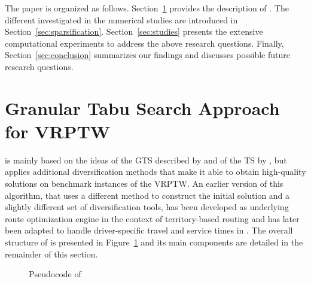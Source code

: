 \documentclass[11pt,a4paper,fleqn]{article}
\begin{document}
The paper is organized as follows.  Section~\ref{sec:GranularTS} provides the description of \tsnew. The different \sms investigated in the numerical studies are introduced in Section~\ref{sec:sparsification}. Section~\ref{sec:studies} presents the extensive computational experiments to address the above research questions. Finally, Section~\ref{sec:conclusion} summarizes our findings and  discusses possible future research questions.

\section{Granular Tabu Search Approach for VRPTW}
\label{sec:GranularTS}
\tsnew is mainly based on the ideas of the GTS described by \citet{toth:03} and of the TS by \citet{cordeau:97,cordeau:01}, but applies additional diversification methods that make it able to obtain high-quality solutions on benchmark instances of the VRPTW. An earlier version of this algorithm, that uses a different method to construct the initial solution and a slightly different set of diversification tools, has been developed as underlying route optimization engine in the context of territory-based routing \citep[see][]{schneider:14:territory} and has later been adapted to handle  driver-specific travel and service times in \citet{schneider:14:ds}. 
%
The overall structure of \tsnew is presented in  Figure~\ref{fig:overview} and its main components are detailed in the remainder of this section.
%
\begin{figure}[htbp]
  \caption{Pseudocode of \tsnew}
  \label{fig:overview}
 \end{figure}
\end{document}
